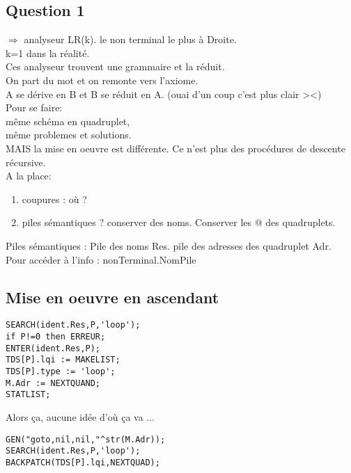 \documentclass[10pt,a4paper]{article}
\begin{document}
\subsection*{Question 1}

$\Rightarrow$ analyseur LR(k). le non terminal le plus à Droite.\\
k=1 dans la réalité.\\
Ces analyseur trouvent une grammaire et la réduit.\\
On part du mot et on remonte vers l'axiome.\\
A se dérive en B et B se réduit en A. (ouai d'un coup c'est plus clair ><)\\

Pour se faire:\\
même schéma en quadruplet,\\
même problemes et solutions.\\
MAIS la mise en oeuvre est différente. Ce n'est plus des procédures de descente récursive.\\
A la place:
\begin{enumerate}
    \item coupures : où ?
    \item piles sémantiques ? conserver des noms. Conserver les @ des quadruplets.
\end{enumerate}
Piles sémantiques : Pile des noms Res. pile des adresses des quadruplet Adr.\\
Pour accéder à l'info : nonTerminal.NomPile\\

\subsection*{Mise en oeuvre en ascendant}
\begin{lstlisting}
SEARCH(ident.Res,P,'loop');
if P!=0 then ERREUR;
ENTER(ident.Res,P);
TDS[P].lqi := MAKELIST;
TDS[P].type := 'loop';
M.Adr := NEXTQUAND;
STATLIST;
\end{lstlisting}
Alors ça, aucune idée d'où ça va ...
\begin{lstlisting}
GEN("goto,nil,nil,"^str(M.Adr));
SEARCH(ident.Res,P,'loop');
BACKPATCH(TDS[P].lqi,NEXTQUAD);
\end{lstlisting}
\end{document}
